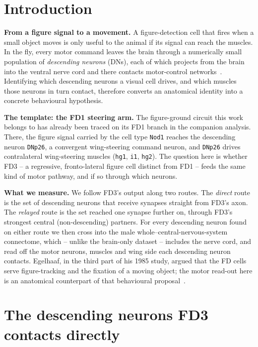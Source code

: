 \documentclass[11pt]{article}
\newcommand{\ttt}[1]{\texttt{#1}}
\begin{document}
\section{Introduction}

\textbf{From a figure signal to a movement.}\quad
A figure-detection cell that fires when a small object moves is only useful to the animal if its
signal can reach the muscles. In the fly, every motor command leaves the brain through a
numerically small population of \emph{descending neurons} (DNs), each of which projects from the
brain into the ventral nerve cord and there contacts motor-control networks~\cite{namiki2018}.
Identifying which descending neurons a visual cell drives, and which muscles those neurons in turn
contact, therefore converts an anatomical identity into a concrete behavioural hypothesis.

\textbf{The template: the FD1 steering arm.}\quad
The figure-ground circuit this work belongs to has already been traced on its FD1 branch in the
companion analysis. There,
the figure signal carried by the cell type \ttt{Nod1} reaches the descending neuron \ttt{DNp26}, a
convergent wing-steering command neuron, and \ttt{DNp26} drives contralateral wing-steering muscles
(\ttt{hg1}, \ttt{i1}, \ttt{hg2}). The question here is whether FD3 -- a regressive,
fronto-lateral figure cell distinct from FD1 -- feeds the same kind of motor pathway, and if so
through which neurons.

\textbf{What we measure.}\quad
We follow FD3's output along two routes. The \emph{direct} route is the set of descending neurons
that receive synapses straight from FD3's axon. The \emph{relayed} route is the set reached one
synapse further on, through FD3's strongest central (non-descending) partners. For every descending
neuron found on either route we then cross into the male whole--central-nervous-system connectome,
which -- unlike the brain-only dataset -- includes the nerve cord, and read off the motor neurons,
muscles and wing side each descending neuron contacts. Egelhaaf, in the third part of his 1985
study, argued that the FD cells serve figure-tracking and the fixation of a moving object; the motor
read-out here is an anatomical counterpart of that behavioural proposal~\cite{egelhaaf1985c}.

\section{The descending neurons FD3 contacts directly}
\end{document}
